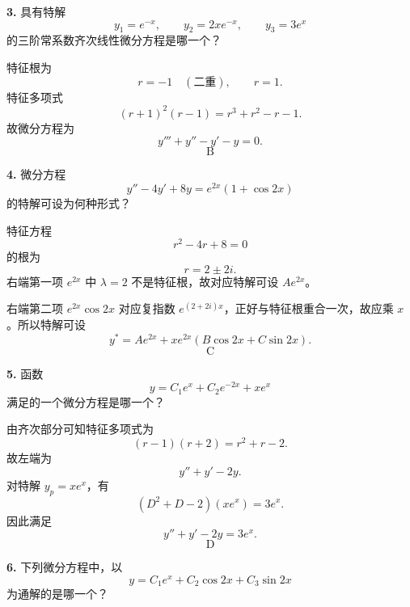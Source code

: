\begin{problemblock}
\textbf{3.} 具有特解
\[
y_1=e^{-x},\qquad y_2=2xe^{-x},\qquad y_3=3e^x
\]
的三阶常系数齐次线性微分方程是哪一个？
\end{problemblock}

\begin{solutionblock}
特征根为
\[
r=-1\quad(\text{二重}),\qquad r=1.
\]
特征多项式
\[
(r+1)^2(r-1)=r^3+r^2-r-1.
\]
故微分方程为
\[
y'''+y''-y'-y=0.
\]
\[
\boxed{\text{B}}
\]
\end{solutionblock}

\begin{problemblock}
\textbf{4.} 微分方程
\[
y''-4y'+8y=e^{2x}(1+\cos2x)
\]
的特解可设为何种形式？
\end{problemblock}

\begin{solutionblock}
特征方程
\[
r^2-4r+8=0
\]
的根为
\[
r=2\pm2i.
\]
右端第一项 \(e^{2x}\) 中 \(\lambda=2\) 不是特征根，故对应特解可设 \(Ae^{2x}\)。

右端第二项 \(e^{2x}\cos2x\) 对应复指数 \(e^{(2+2i)x}\)，正好与特征根重合一次，故应乘 \(x\)。所以特解可设
\[
y^*=Ae^{2x}+xe^{2x}(B\cos2x+C\sin2x).
\]
\[
\boxed{\text{C}}
\]
\end{solutionblock}

\begin{problemblock}
\textbf{5.} 函数
\[
y=C_1e^x+C_2e^{-2x}+xe^x
\]
满足的一个微分方程是哪一个？
\end{problemblock}

\begin{solutionblock}
由齐次部分可知特征多项式为
\[
(r-1)(r+2)=r^2+r-2.
\]
故左端为
\[
y''+y'-2y.
\]
对特解 \(y_p=xe^x\)，有
\[
(D^2+D-2)(xe^x)=3e^x.
\]
因此满足
\[
y''+y'-2y=3e^x.
\]
\[
\boxed{\text{D}}
\]
\end{solutionblock}

\begin{problemblock}
\textbf{6.} 下列微分方程中，以
\[
y=C_1e^x+C_2\cos2x+C_3\sin2x
\]
为通解的是哪一个？
\end{problemblock}

